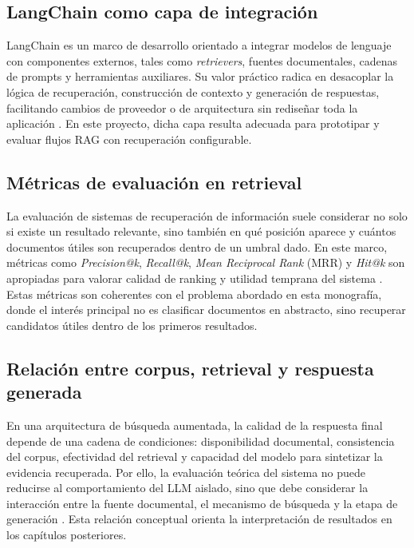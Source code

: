 \subsection{LangChain como capa de integración}

LangChain es un marco de desarrollo orientado a integrar modelos de lenguaje con componentes externos, tales como \textit{retrievers}, fuentes documentales, cadenas de prompts y herramientas auxiliares. Su valor práctico radica en desacoplar la lógica de recuperación, construcción de contexto y generación de respuestas, facilitando cambios de proveedor o de arquitectura sin rediseñar toda la aplicación \parencite{langchain2025}. En este proyecto, dicha capa resulta adecuada para prototipar y evaluar flujos RAG con recuperación configurable.

\subsection{Métricas de evaluación en retrieval}

La evaluación de sistemas de recuperación de información suele considerar no solo si existe un resultado relevante, sino también en qué posición aparece y cuántos documentos útiles son recuperados dentro de un umbral dado. En este marco, métricas como \textit{Precision@k}, \textit{Recall@k}, \textit{Mean Reciprocal Rank} (MRR) y \textit{Hit@k} son apropiadas para valorar calidad de ranking y utilidad temprana del sistema \parencite{manning2008ir}. Estas métricas son coherentes con el problema abordado en esta monografía, donde el interés principal no es clasificar documentos en abstracto, sino recuperar candidatos útiles dentro de los primeros resultados.

\subsection{Relación entre corpus, retrieval y respuesta generada}

En una arquitectura de búsqueda aumentada, la calidad de la respuesta final depende de una cadena de condiciones: disponibilidad documental, consistencia del corpus, efectividad del retrieval y capacidad del modelo para sintetizar la evidencia recuperada. Por ello, la evaluación teórica del sistema no puede reducirse al comportamiento del LLM aislado, sino que debe considerar la interacción entre la fuente documental, el mecanismo de búsqueda y la etapa de generación \parencite{lewis2020rag, langchain2025}. Esta relación conceptual orienta la interpretación de resultados en los capítulos posteriores.

